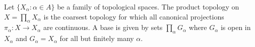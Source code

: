 Let $\{X_\alpha : \alpha \in A\}$ be a family of topological spaces. The product topology on $X = \prod_\alpha X_\alpha$ is the coarsest topology for which all canonical projections $\pi_\alpha: X \to X_\alpha$ are continuous. A base is given by sets $\prod_\alpha G_\alpha$ where $G_\alpha$ is open in $X_\alpha$ and $G_\alpha = X_\alpha$ for all but finitely many $\alpha$.
